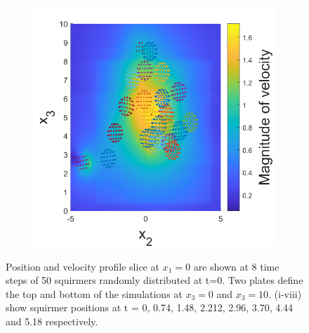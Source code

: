 \begin{figure}
\begin{subfigure}[b]{0.22\textwidth}
    \caption[]{\label{fig:squirmerG}}
\end{subfigure}
\begin{subfigure}[b]{0.22\textwidth}
    \centering
    \includegraphics[width=\textwidth]{Images/squirmers/Gyro-8.pdf}
    \caption[]{\label{fig:squirmerH}}
\end{subfigure}
\label{fig:SquiremerGyro}
\caption[Position and velocity profile at 8 time steps of 50 squiremers randomly distributed at t=0.]{Position and velocity profile slice at $x_1=0$ are shown at 8 time steps of 50 squirmers randomly distributed at t=0. Two plates define the top and bottom of the simulations at $x_3 = 0$ and  $x_3 = 10$. (i-viii) show squirmer positions at t = 0, 0.74, 1.48, 2.212, 2.96, 3.70, 4.44 and 5.18 respectively.}
\end{figure}
